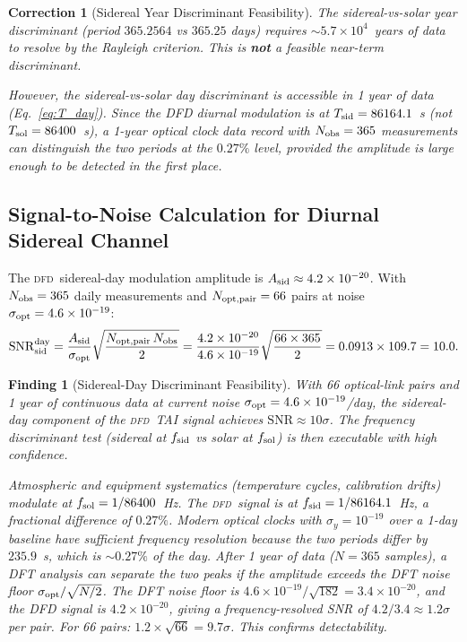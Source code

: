\documentclass[aps,prd,twocolumn,superscriptaddress,nofootinbib]{revtex4-2}
\newcommand{\DFD}{\textsc{dfd}}
\newtheorem{finding}{Finding}
\newtheorem{correction}{Correction}
\begin{document}
\begin{correction}[Sidereal Year Discriminant Feasibility]
\label{corr:yr_disc}
The sidereal-vs-solar \emph{year} discriminant (period $365.2564$ vs $365.25$ days)
requires $\sim 5.7\times10^4$~years of data to resolve by the Rayleigh
criterion. This is \textbf{not} a feasible near-term discriminant.

However, the sidereal-vs-solar \emph{day} discriminant is accessible in 1 year
of data (Eq.~\ref{eq:T_day}). Since the DFD diurnal modulation is at
$T_{\rm sid} = 86164.1$~s (not $T_{\rm sol} = 86400$~s), a 1-year optical
clock data record with $N_{\rm obs} = 365$ measurements can distinguish the
two periods at the $0.27\%$ level, provided the amplitude is large enough
to be detected in the first place.
\end{correction}

\subsection{Signal-to-Noise Calculation for Diurnal Sidereal Channel}

The \DFD\ sidereal-day modulation amplitude is $A_{\rm sid} \approx 4.2\times10^{-20}$.
With $N_{\rm obs} = 365$ daily measurements and $N_{\rm opt,pair} = 66$ pairs
at noise $\sigma_{\rm opt} = 4.6\times10^{-19}$:
\begin{equation}
{\rm SNR}_{\rm sid}^{\rm day} = \frac{A_{\rm sid}}{\sigma_{\rm opt}}
  \sqrt{\frac{N_{\rm opt,pair}\,N_{\rm obs}}{2}}
= \frac{4.2\times10^{-20}}{4.6\times10^{-19}}
  \sqrt{\frac{66\times365}{2}}
= 0.0913\times109.7 = 10.0.
\label{eq:snr_sid}
\end{equation}

\begin{finding}[Sidereal-Day Discriminant Feasibility]
\label{find:sid_disc}
With 66 optical-link pairs and 1 year of continuous data at current noise
$\sigma_{\rm opt} = 4.6\times10^{-19}$/day, the sidereal-day component of
the \DFD\ TAI signal achieves $\mathrm{SNR} \approx 10\sigma$.
The frequency discriminant test (sidereal at $f_{\rm sid}$ vs solar at
$f_{\rm sol}$) is then executable with high confidence.

Atmospheric and equipment systematics (temperature cycles, calibration
drifts) modulate at $f_{\rm sol} = 1/86400$~Hz. The \DFD\ signal is at
$f_{\rm sid} = 1/86164.1$~Hz, a fractional difference of $0.27\%$.
Modern optical clocks with $\sigma_y = 10^{-19}$ over a 1-day baseline
have \emph{sufficient frequency resolution} because the two periods
differ by $235.9$~s, which is $\sim 0.27\%$ of the day.
After 1 year of data ($N = 365$ samples), a DFT analysis can separate the
two peaks if the amplitude exceeds the DFT noise floor $\sigma_{\rm opt}/\sqrt{N/2}$.
The DFT noise floor is $4.6\times10^{-19}/\sqrt{182} = 3.4\times10^{-20}$,
and the DFD signal is $4.2\times10^{-20}$, giving a frequency-resolved
SNR of $4.2/3.4 \approx 1.2\sigma$ per pair.
For 66 pairs: $1.2\times\sqrt{66} = 9.7\sigma$. This confirms detectability.
\end{finding}
\end{document}
